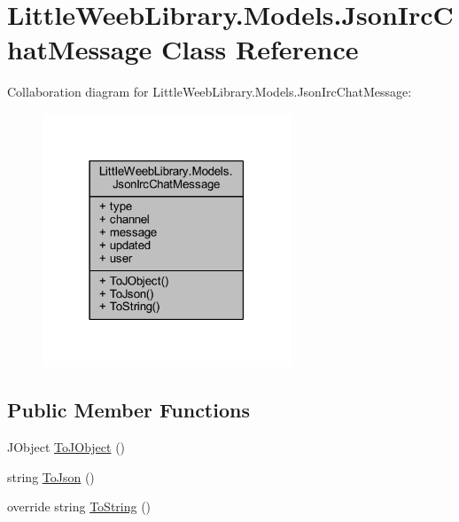 \hypertarget{class_little_weeb_library_1_1_models_1_1_json_irc_chat_message}{}\section{Little\+Weeb\+Library.\+Models.\+Json\+Irc\+Chat\+Message Class Reference}
\label{class_little_weeb_library_1_1_models_1_1_json_irc_chat_message}


Collaboration diagram for Little\+Weeb\+Library.\+Models.\+Json\+Irc\+Chat\+Message\+:\nopagebreak
\begin{figure}[H]
\begin{center}
\leavevmode
\includegraphics[width=210pt]{class_little_weeb_library_1_1_models_1_1_json_irc_chat_message__coll__graph}
\end{center}
\end{figure}
\subsection*{Public Member Functions}
\begin{DoxyCompactItemize}
\item 
J\+Object \mbox{\hyperlink{class_little_weeb_library_1_1_models_1_1_json_irc_chat_message_a1f96ba6c751985a71f547d1e0dee171d}{To\+J\+Object}} ()
\item 
string \mbox{\hyperlink{class_little_weeb_library_1_1_models_1_1_json_irc_chat_message_acbac803fd5e8ecffab5335a4069fc4b4}{To\+Json}} ()
\item 
override string \mbox{\hyperlink{class_little_weeb_library_1_1_models_1_1_json_irc_chat_message_ae54b09f8720f6ade5ed128496a4da690}{To\+String}} ()
\end{DoxyCompactItemize}
